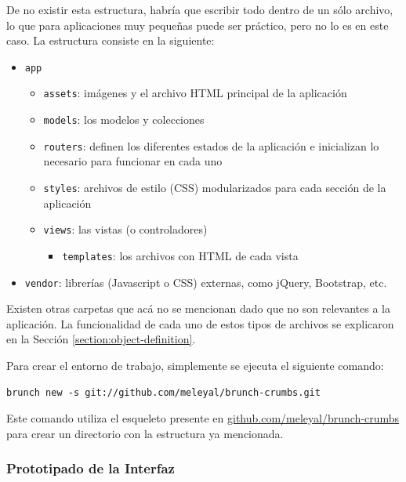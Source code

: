 \documentclass[12pt,titlepage,]{article}
\begin{document}
De no existir esta estructura, habría que escribir todo dentro de un
sólo archivo, lo que para aplicaciones muy pequeñas puede ser práctico,
pero no lo es en este caso. La estructura consiste en la siguiente:

\begin{itemize}
\item
  \texttt{app}

  \begin{itemize}
  \item
    \texttt{assets}: imágenes y el archivo HTML principal de la
    aplicación
  \item
    \texttt{models}: los modelos y colecciones
  \item
    \texttt{routers}: definen los diferentes estados de la aplicación e
    inicializan lo necesario para funcionar en cada uno
  \item
    \texttt{styles}: archivos de estilo (CSS) modularizados para cada
    sección de la aplicación
  \item
    \texttt{views}: las vistas (o controladores)

    \begin{itemize}
    \item
      \texttt{templates}: los archivos con HTML de cada vista
    \end{itemize}
  \end{itemize}
\item
  \texttt{vendor}: librerías (Javascript o CSS) externas, como jQuery,
  Bootstrap, etc.
\end{itemize}

Existen otras carpetas que acá no se mencionan dado que no son
relevantes a la aplicación. La funcionalidad de cada uno de estos tipos
de archivos se explicaron en la Sección \ref{section:object-definition}.

Para crear el entorno de trabajo, simplemente se ejecuta el siguiente
comando:

\begin{verbatim}
brunch new -s git://github.com/meleyal/brunch-crumbs.git
\end{verbatim}

Este comando utiliza el esqueleto presente en
\href{https://github.com/meleyal/brunch-crumbs}{github.com/meleyal/brunch-crumbs}
para crear un directorio con la estructura ya mencionada.

\subsubsection{Prototipado de la Interfaz}
\end{document}
